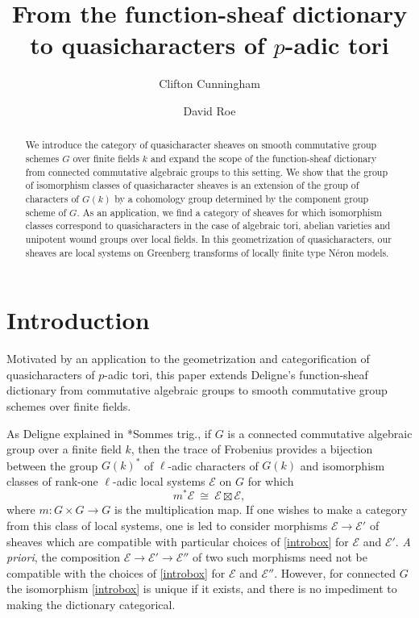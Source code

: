 \documentclass[10pt]{amsart}
\title{From the function-sheaf dictionary to quasicharacters of $p$-adic tori}
\author{Clifton Cunningham}
\author{David Roe}
\theoremstyle{plain}
\theoremstyle{definition}
\theoremstyle{remark}
\newcommand{\Fq}{k}
\newcommand{\iso}{{\ \cong\ }}
\newcommand{\qcs}[1]{{\mathcal{#1}}}
\begin{document}
\begin{abstract}
We introduce the category of quasicharacter sheaves on smooth commutative group schemes $G$ over finite fields $k$ and expand the scope of the function-sheaf dictionary from connected commutative algebraic groups to this setting.
We show that the group of isomorphism classes of quasicharacter sheaves is an extension of the group of characters of $G(k)$ by a cohomology group determined by the component group scheme of $G$.
As an application, we find a category of sheaves for which isomorphism classes correspond to quasi\-characters in the case of algebraic tori, abelian varieties and unipotent wound groups over local fields. 
In this geometrization of quasicharacters, our sheaves are local systems on
Greenberg transforms of locally finite type N\'eron models.
\end{abstract}

\maketitle

\section*{Introduction}

Motivated by an application to the geometrization and categorification of quasicharacters of $p$-adic tori,
this paper extends Deligne's function-sheaf dictionary from commutative algebraic groups to smooth commutative group schemes over finite fields. 

As Deligne explained in \cite{deligne:SGA4.5}*{Sommes trig.}, if $G$ is a connected commutative algebraic group over a finite field $k$, then the trace of Frobenius provides a bijection between the group $G(\Fq)^*$ of $\ell$-adic characters of $G(\Fq)$ and isomorphism classes of rank-one $\ell$-adic local systems $\mathcal{E}$ on $G$ for which 
\begin{equation}\label{introbox}
m^* \qcs{E} \iso \qcs{E} \boxtimes \qcs{E},
\end{equation}
where $m : G\times G\to G$ is the multiplication map.
%
If one wishes to make a category from this class of local systems, one is led to consider morphisms $\qcs{E} \to \qcs{E}'$ of sheaves which are compatible with particular choices of \eqref{introbox} for $\qcs{E}$ and $\qcs{E'}$. 
{\it A priori}, the composition $\qcs{E} \to \qcs{E}' \to \qcs{E}''$ of two such morphisms need not be compatible with the choices of \eqref{introbox} for $\qcs{E}$ and $\qcs{E}''$.
 However, for connected $G$ the isomorphism \eqref{introbox} is unique if it exists, and there is no impediment to making the dictionary categorical.
\end{document}
